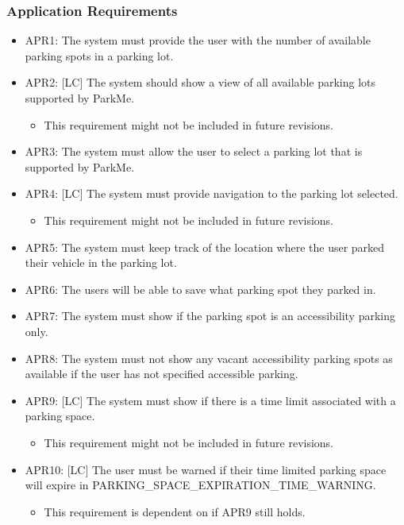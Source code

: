 \documentclass[]{article}
\begin{document}
	\subsubsection{Application Requirements}
	\begin{itemize}
		\item APR1: The system must provide the user with the number of available parking spots in a parking lot.
		
		\item APR2: [LC] The system should show a view of all available parking lots supported by ParkMe.
		\begin{itemize}
			\item This requirement might not be included in future revisions. 
		\end{itemize}
		
		\item APR3: The system must allow the user to select a parking lot that is supported by ParkMe.
	
		\item APR4: [LC] The system must provide navigation to the parking lot selected.
		\begin{itemize}
			\item This requirement might not be included in future revisions.
		\end{itemize}
		
		\item APR5: The system must keep track of the location where the user parked their vehicle in the parking lot.
		
		\item APR6: The users will be able to save what parking spot they parked in.
		
		\item APR7: The system must show if the parking spot is an accessibility parking only.
		
		\item APR8: The system must not show any vacant accessibility parking spots as available if the user has not specified accessible parking.
		
		\item APR9: [LC] The system must show if there is a time limit associated with a parking space.
		\begin{itemize}
			\item This requirement might not be included in future revisions.
		\end{itemize}
	
		\item APR10: [LC] The user must be warned if their time limited parking space will expire in PARKING\_SPACE\_EXPIRATION\_TIME\_WARNING.
		\begin{itemize}
			\item This requirement is dependent on if APR9 still holds.
		\end{itemize}
		

\end{itemize}
\end{document}
